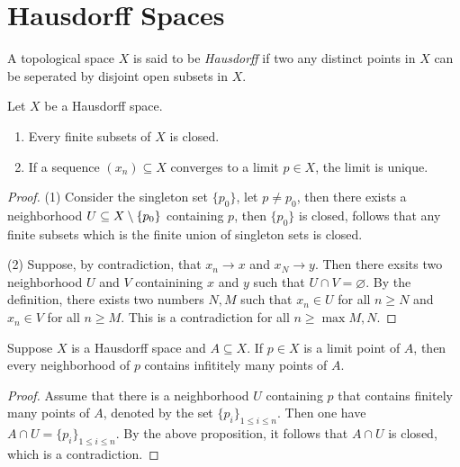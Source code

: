 \section{Hausdorff Spaces}
\begin{definition}
    A topological space $X$ is said to be \textit{Hausdorff} if two any distinct points in $X$ can be seperated by disjoint open subsets in $X$.
\end{definition}
\begin{proposition}
    Let $X$ be a Hausdorff space.
    \begin{enumerate}[itemsep=0pt]
        \item Every finite subsets of $X$ is closed.
        \item If a sequence $(x_n) \subseteq X$ converges to a limit $p \in X$, the limit is unique.
    \end{enumerate}
\end{proposition}
\begin{proof}
    (1) Consider the singleton set $\{p_0\}$, let $p \neq p_0$, then there exists a neighborhood $U \subseteq X \setminus \{p_0\}$ containing $p$, then $\{p_0\}$ is closed, follows that any finite subsets which is the finite union of singleton sets is closed.

    (2) Suppose, by contradiction, that $x_n \to x$ and $x_N \to y$. Then there exsits two neighborhood $U$ and $V$ containining $x$ and $y$ such that $U \cap V = \varnothing$. By the definition, there exists two numbers $N,M$ such that $x_n \in U$ for all $n \geq N$ and $x_n \in V$ for all $n \geq M$. This is a contradiction for all $n \geq \max{M,N}$.
\end{proof}
\begin{proposition}
    Suppose $X$ is a Hausdorff space and $A \subseteq X$. If $p \in X$ is a limit point of $A$, then every neighborhood of $p$ contains infititely many points of $A$.
\end{proposition}
\begin{proof}
    Assume that there is a neighborhood $U$ containing $p$ that contains finitely many points of $A$, denoted by the set $\{p_i\}_{1 \leq i \leq n}$. Then one have $A \cap U = \{p_i\}_{1 \leq i \leq n}$. By the above proposition, it follows that $A \cap U$ is closed, which is a contradiction.
\end{proof}
